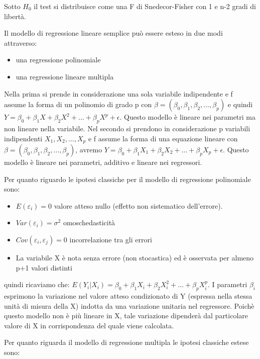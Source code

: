 \documentclass[a4paper]{extarticle}
\begin{document}
Sotto $H_0$ il test si distribuisce come una F di Snedecor-Fisher con 1 e n-2 gradi di libertà. 

Il modello di regressione lineare semplice può essere esteso in due modi attraverso:

\begin{itemize}
\item una regressione polinomiale 
\item una regressione lineare multipla
\end{itemize}

Nella prima si prende in considerazione una sola variabile indipendente e f assume la forma di un polinomio di grado p con $\beta = (\beta_0, \beta_1, \beta_2,\dots, \beta_p)$ e quindi $Y= \beta_0 + \beta_1 X + \beta_2 X^2 + \dots + \beta_p X^p + \epsilon$. Questo modello è lineare nei parametri ma non lineare nella variabile.  Nel secondo si prendono in considerazione p variabili indipendenti $X_1,X_2,\dots, X_p$ e f assume la forma di una equazione lineare con $\beta = (\beta_0, \beta_1,\beta_2,\dots, \beta_p)$, avremo $Y = \beta_0 + \beta_1X_1 + \beta_2 X_2+ \dots + \beta_p X_p + \epsilon$. Questo modello è lineare nei parametri, additivo e lineare nei regressori.

Per quanto riguardo le ipotesi classiche per il modello di regressione polinomiale sono:

\begin{itemize}
\item $E( \varepsilon_i)=0$ valore atteso nullo (effetto non sistematico dell'errore).
\item $Var(\varepsilon_i) = \sigma^2$ omoschedasticità
\item  $Cov(\varepsilon_i,\varepsilon_j) = 0$ incorrelazione tra gli errori
\item La variabile X è nota senza errore (non stocastica) ed è osservata per almeno p+1 valori distinti
\end{itemize}

quindi ricaviamo che: $E(Y_i|X_i) = \beta_0 + \beta_1 X_i + \beta_2 X_i^2 + \dots + \beta_pX_i^p$. I parametri $\beta_i$ esprimono la variazione nel valore atteso condizionato di Y (espressa nella stessa unità di misura della X) indotta da una variazione unitaria nel regressore. Poichè questo modello non è più lineare in X, tale variazione dipenderà dal particolare valore di X in corrispondenza del quale viene calcolata.

Per quanto riguarda il modello di regressione multipla le ipotesi classiche estese sono:
\end{document}
